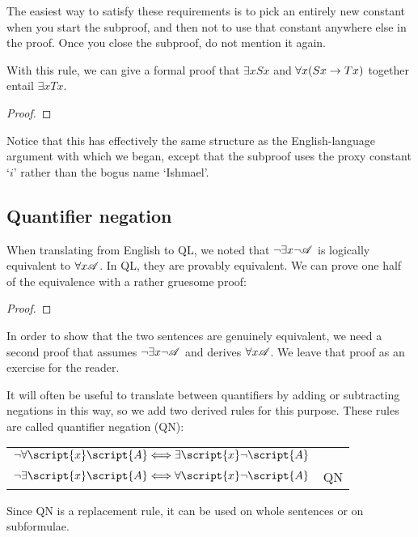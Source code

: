 The easiest way to satisfy these requirements is to pick an entirely new constant when you start the subproof, and then not to use that constant anywhere else in the proof. Once you close the subproof, do not mention it again.

With this rule, we can give a formal proof that $\exists x Sx$ and $\forall x(Sx \rightarrow Tx)$ together entail $\exists x Tx$.

\begin{proof}
	\open
		 
	\close
\end{proof}

Notice that this has effectively the same structure as the English-language argument with which we began, except that the subproof uses the proxy constant `$i$' rather than the bogus name `Ishmael'.

\subsection{Quantifier negation}

When translating from English to QL, we noted that $\neg\exists x\neg\mathscr{A}$ is logically equivalent to $\forall x\mathscr{A}$. In QL, they are provably equivalent. We can prove one half of the equivalence with a rather gruesome proof:

\begin{proof}
	 
	\open
		\open
			\open
			\close
		\close
	\close
\end{proof}

In order to show that the two sentences are genuinely equivalent, we need a second proof that assumes $\neg\exists x\neg\mathscr{A}$ and derives $\forall x\mathscr{A}$. We leave that proof as an exercise for the reader.

It will often be useful to translate between quantifiers by adding or subtracting negations in this way, so we add two derived rules for this purpose. These rules are called quantifier negation (QN):
\begin{center}
\begin{tabular}{rl}
$\enot\forall\script{x}\script{A} \Longleftrightarrow \exists\script{x}\enot\script{A}$\\
$\enot\exists\script{x}\script{A} \Longleftrightarrow \forall\script{x}\enot\script{A}$
& QN
\end{tabular}
\end{center}
Since QN is a replacement rule, it can be used on whole sentences or on subformulae.



